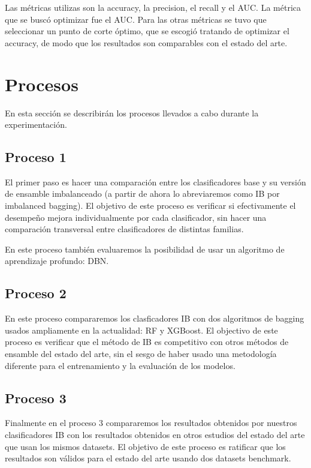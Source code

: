 Las métricas utilizas son la accuracy, la precision, el recall y el AUC. La métrica que se buscó optimizar fue el AUC. Para las otras métricas se tuvo que seleccionar un punto de corte óptimo, que se escogió tratando de optimizar el accuracy, de modo que los resultados son comparables con el estado del arte.

\section{Procesos}

En esta sección se describirán los procesos llevados a cabo durante la experimentación.

\subsection{Proceso 1}

El primer paso es hacer una comparación entre los clasificadores base y su versión de ensamble imbalanceado (a partir de ahora lo abreviaremos como IB por imbalanced bagging). El objetivo de este proceso es verificar si efectivamente el desempeño mejora individualmente por cada clasificador, sin hacer una comparación transversal entre clasificadores de distintas familias.

En este proceso también evaluaremos la posibilidad de usar un algoritmo de aprendizaje profundo: \ac{DBN}.

\subsection{Proceso 2}

En este proceso compararemos los clasficadores IB con dos algoritmos de bagging usados ampliamente en la actualidad: \ac{RF} y \ac{XGBoost}. El objectivo de este proceso es verificar que el método de IB es competitivo con otros métodos de ensamble del estado del arte, sin el sesgo de haber usado una metodología diferente para el entrenamiento y la evaluación de los modelos.

\subsection{Proceso 3}

Finalmente en el proceso 3 compararemos los resultados obtenidos por nuestros clasificadores IB con los resultados obtenidos en otros estudios del estado del arte que usan los mismos datasets. El objetivo de este proceso es ratificar que los resultados son válidos para el estado del arte usando dos datasets benchmark.
